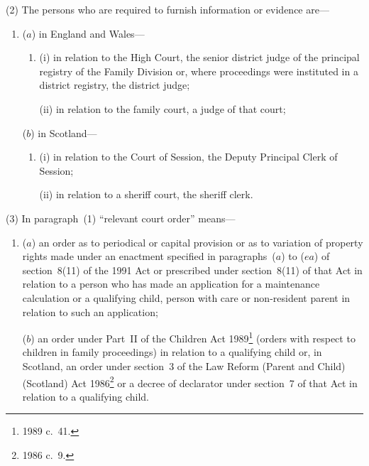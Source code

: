 \documentclass[12pt,a4paper]{article}
\begin{document}
(2) The persons who are required to furnish information or evidence are—
\begin{enumerate}\item[]
($a$) in England and Wales—
\begin{enumerate}\item[]
(i) in relation to the High Court, the senior district judge of the principal registry of the Family Division or, where proceedings were instituted in a district registry, the district judge;

%

(ii) in relation to the family court, a judge of that court;
\end{enumerate}

($b$) in Scotland—
\begin{enumerate}\item[]
(i) in relation to the Court of Session, the Deputy Principal Clerk of Session;

(ii) in relation to a sheriff court, the sheriff clerk.
\end{enumerate}
\end{enumerate}

(3) In paragraph~(1) “relevant court order” means—
\begin{enumerate}\item[]
($a$) an order as to periodical or capital provision or as to variation of property rights made under an enactment specified in paragraphs~($a$)  to ($ea$)  of section~8(11) of the 1991 Act or prescribed under section~8(11) of that Act in relation to a person who has made an application for a maintenance calculation or a qualifying child, person with care or non-resident parent in relation to such an application;

($b$) an order under Part~II of the Children Act 1989\footnote{1989 c.~41.} (orders with respect to children in family proceedings) in relation to a qualifying child or, in Scotland, an order under section~3 of the Law Reform (Parent and Child) (Scotland) Act 1986\footnote{1986 c.~9.} or a decree of declarator under section~7 of that Act in relation to a qualifying child.
\end{enumerate}
\end{document}
